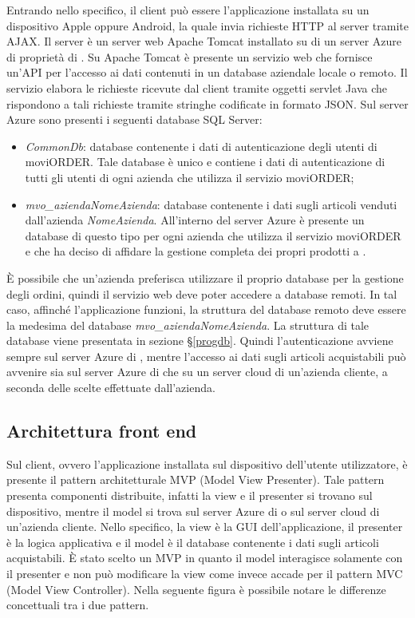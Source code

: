 Entrando nello specifico, il client può essere l'applicazione installata su un dispositivo Apple oppure Android, la quale invia richieste HTTP al server tramite AJAX. Il server è un server web Apache Tomcat installato su di un server Azure di proprietà di \visione{}. Su Apache Tomcat è presente un servizio web che fornisce un'API per l'accesso ai dati contenuti in un database aziendale locale o remoto. Il servizio elabora le richieste ricevute dal client tramite oggetti servlet Java che rispondono a tali richieste tramite stringhe codificate in formato JSON. Sul server Azure sono presenti i seguenti database SQL Server:
\begin{itemize}
	\item \textit{CommonDb}: database contenente i dati di autenticazione degli utenti di moviORDER. Tale database è unico e contiene i dati di autenticazione di tutti gli utenti di ogni azienda che utilizza il servizio moviORDER;
	\item \textit{mvo\_aziendaNomeAzienda}: database contenente i dati sugli articoli venduti dall'azienda \textit{NomeAzienda}. All'interno del server Azure è presente un database di questo tipo per ogni azienda che utilizza il servizio moviORDER e che ha deciso di affidare la gestione completa dei propri prodotti a \visione{}.
\end{itemize}
È possibile che un'azienda preferisca utilizzare il proprio database per la gestione degli ordini, quindi il servizio web deve poter accedere a database remoti. In tal caso, affinché l'applicazione funzioni, la struttura del database remoto deve essere la medesima del database \textit{mvo\_aziendaNomeAzienda}. La struttura di tale database viene presentata in sezione §\ref{progdb}.
Quindi l'autenticazione avviene sempre sul server Azure di \visione{}, mentre l'accesso ai dati sugli articoli acquistabili può avvenire sia sul server Azure di \visione{} che su un server cloud di un'azienda cliente, a seconda delle scelte effettuate dall'azienda.

\subsection{Architettura front end}

Sul client, ovvero l'applicazione installata sul dispositivo dell'utente utilizzatore, è presente il pattern architetturale MVP (Model View Presenter). Tale pattern presenta componenti distribuite, infatti la view e il presenter si trovano sul dispositivo, mentre il model si trova sul server Azure di \visione{} o sul server cloud di un'azienda cliente. Nello specifico, la view è la GUI dell'applicazione, il presenter è la logica applicativa e il model è il database contenente i dati sugli articoli acquistabili. È stato scelto un MVP in quanto il model interagisce solamente con il presenter e non può modificare la view come invece accade per il pattern MVC (Model View Controller). Nella seguente figura è possibile notare le differenze concettuali tra i due pattern.

